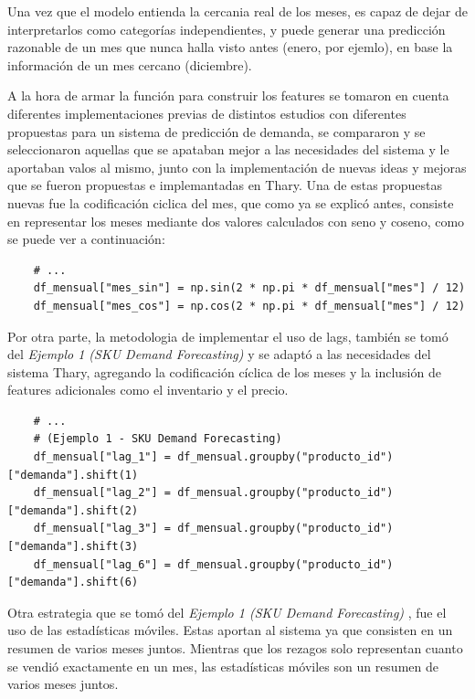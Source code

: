 Una vez que el modelo entienda la cercania real de los meses, es capaz de dejar de interpretarlos como categorías independientes, y puede generar una predicción razonable de un mes que nunca halla visto antes (enero, por ejemlo), en base la información de un mes cercano (diciembre).

A la hora de armar la función para construir los features se tomaron en cuenta diferentes implementaciones previas de distintos estudios con diferentes propuestas para un sistema de predicción de demanda, se compararon y se seleccionaron aquellas que se apataban mejor a las necesidades del sistema y le aportaban valos al mismo, junto con la implementación de nuevas ideas y mejoras que se fueron propuestas e implemantadas en Thary. Una de estas propuestas nuevas fue la codificación ciclica del mes, que como ya se explicó antes, consiste en representar los meses mediante dos valores calculados con seno y coseno, como se puede ver a continuación:

\label{lst:features_ciclico}
\begin{verbatim}
    # ...
    df_mensual["mes_sin"] = np.sin(2 * np.pi * df_mensual["mes"] / 12)
    df_mensual["mes_cos"] = np.cos(2 * np.pi * df_mensual["mes"] / 12)
\end{verbatim}

Por otra parte, la metodologia de implementar el uso de lags, también se tomó del \textit{Ejemplo 1 (SKU Demand Forecasting)} \cite{ejemplo1_demandforecast} y se adaptó a las necesidades del sistema Thary, agregando la codificación cíclica de los meses y la inclusión de features adicionales como el inventario y el precio.

\label{lst:features_lags}
\begin{verbatim}
    # ... 
    # (Ejemplo 1 - SKU Demand Forecasting)
    df_mensual["lag_1"] = df_mensual.groupby("producto_id")["demanda"].shift(1)
    df_mensual["lag_2"] = df_mensual.groupby("producto_id")["demanda"].shift(2)
    df_mensual["lag_3"] = df_mensual.groupby("producto_id")["demanda"].shift(3)
    df_mensual["lag_6"] = df_mensual.groupby("producto_id")["demanda"].shift(6)
\end{verbatim}

Otra estrategia que se tomó del \textit{Ejemplo 1 (SKU Demand Forecasting)} \cite{ejemplo1_demandforecast}, fue el uso de las estadísticas móviles. Estas aportan al sistema ya que consisten en un resumen de varios meses juntos. Mientras que los rezagos solo representan cuanto se vendió exactamente en un mes, las estadísticas móviles son un resumen de varios meses juntos.

